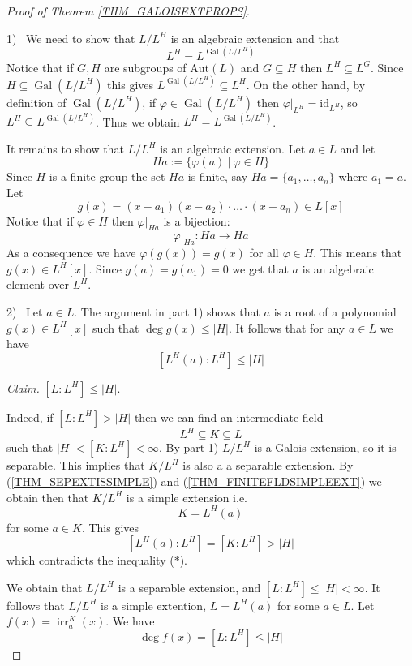 \documentclass[12pt, letterpaper, oneside]{article}
\theoremstyle{plain}
\theoremstyle{definition}
\newcommand{\Aut}{\mathrm{Aut}}
\newcommand{\id}{\mathrm{id}}
\newcommand{\irr}{\operatorname{irr}}
\newcommand{\Gal}{\operatorname{Gal}}
\newcommand{\vs}{\vskip 5mm}
\begin{document}
\begin{proof}[Proof of Theorem \ref{THM_GALOISEXTPROPS}] \ 

1) \  We need to show that  $L/L^{H}$ is an algebraic extension and that 
$$L^{H} = L^{\Gal(L/L^{H})}$$
Notice that if $G, H$ are subgroups of $\Aut(L)$ and $G \subseteq H$ then 
$L^{H} \subseteq L^{G}$.  Since $H \subseteq \Gal(L/L^{H})$ this gives 
$L^{\Gal(L/L^{H})}  \subseteq L^{H}$. On the other hand, by definition 
of $\Gal(L/L^{H})$, if $\varphi\in \Gal(L/L^{H})$ then $\varphi|_{L^{H}} = \id_{L^{H}}$, 
so $L^{H}\subseteq L^{\Gal(L/L^{H})}$.  Thus we obtain $L^{H} = L^{\Gal(L/L^{H})}$.

It remains to show that $L/L^{H}$ is an algebraic extension. Let $a\in L$ and let
$$Ha := \{\varphi(a) \ | \ \varphi\in H \}$$
Since $H$ is a finite group the set $Ha$ is finite, say $Ha = \{a_{1}, \dots, a_{n}\}$
where $a_{1}=a$. Let 
$$g(x) = (x-a_{1})(x-a_{2})\cdot{\dots}\cdot(x-a_{n}) \in L[x]$$
Notice that if $\varphi\in H$ then  $\varphi|_{Ha}$ is a bijection: 
$$\varphi|_{Ha}\colon Ha \to Ha$$
As a consequence we have $\varphi(g(x)) = g(x)$ for all $\varphi\in H$. 
This means that $g(x) \in L^{H}[x]$. Since $g(a)=g(a_{1}) =0$ we get that 
$a$ is an algebraic  element over $L^{H}$.
 
 \vs
 
 2) \ Let $a\in L$. The argument in part 1)  shows that $a$ is a root of a polynomial 
$g(x)\in L^{H}[x]$ such that $\deg g(x) \leq |H|$. It follows that for any $a\in L$ we have 
\begin{equation*}
\tag{$\ast$}
[L^{H}(a) : L^{H}] \leq |H| 
\end{equation*} 
 
 
\emph{Claim.} $[L:L^{H}] \leq |H|$. 

 Indeed, if $[L:L^{H}]  > |H|$ then we can find an intermediate field 
 $$L^{H}\subseteq K \subseteq L$$
 such that $|H| < [K:L^{H}] < \infty$. By part 1) $L/L^{H}$ is a Galois extension, so it is 
 separable.  This implies that $K/L^{H}$ is also a a separable extension. By 
(\ref{THM_SEPEXTISSIMPLE}) and (\ref{THM_FINITEFLDSIMPLEEXT}) we obtain 
then that $K/L^{H}$ is a simple extension i.e. 
$$K = L^{H}(a)$$
for some $a\in K$. This gives 
$$[L^{H}(a): L^{H}] = [K:L^{H}] > |H|$$
which contradicts the inequality ($\ast$). 

\vs

We obtain that $L/L^{H}$ is a separable extension, and $[L:L^{H}] \leq |H| < \infty$. 
It follows that $L/L^{H}$ is a simple extention, $L= L^{H}(a)$ for some $a\in L$. 
Let $f(x) = \irr^{K}_{a}(x)$. We have
$$\deg f(x) = [L : L^{H}] \leq |H|$$


\end{proof}
\end{document}
